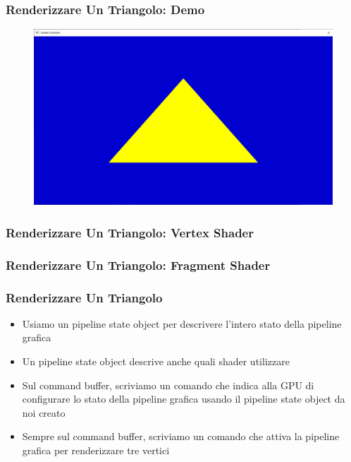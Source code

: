 \begin{frame}
\frametitle{Renderizzare Un Triangolo: Demo}
\begin{figure}[ht]
    \centering
    \includegraphics[scale=0.25]{images/SlidesTriangle/Triangle.png}
\end{figure}
\end{frame}

\begin{frame}
\frametitle{Renderizzare Un Triangolo: Vertex Shader}

\end{frame}

\begin{frame}
\frametitle{Renderizzare Un Triangolo: Fragment Shader}

\end{frame}

\begin{frame}
\frametitle{Renderizzare Un Triangolo}
\begin{itemize}
\item Usiamo un pipeline state object per descrivere l'intero stato della pipeline grafica
\item Un pipeline state object descrive anche quali shader utilizzare
\item Sul command buffer, scriviamo un comando che indica alla GPU di configurare lo stato della pipeline grafica usando il pipeline state object da noi creato
\item Sempre sul command buffer, scriviamo un comando che attiva la pipeline grafica per renderizzare tre vertici
\end{itemize}
\end{frame}
